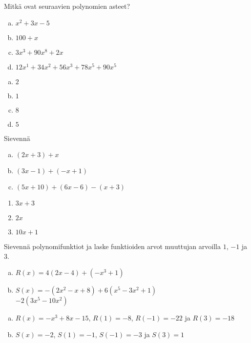 \begin{tehtavasivu}
\begin{tehtava}
	Mitkä ovat seuraavien polynomien asteet?
	\begin{enumerate}[a)]
		\item $x^2 + 3x - 5$
		\item $100 + x$
		\item $3x^3 + 90x^8 + 2x$
		\item $12x^1 + 34x^2 + 56x^3 + 78x^5 + 90x^5$
	\end{enumerate}

	\begin{vastaus}
		\begin{enumerate}[a)]
			\item $2$
			\item $1$
			\item $8$
			\item $5$
		\end{enumerate}
	\end{vastaus}
\end{tehtava}

\begin{tehtava}
     Sievennä
     \begin{enumerate}[a)]
         \item $(2x + 3) + x $
         \item $(3x - 1) + (-x + 1)$
         \item $(5x + 10) + (6x - 6) - (x + 3)$
     \end{enumerate}
     \begin{vastaus}
         \begin{enumerate}
             \item $3x + 3$
             \item $2x$
             \item $10x + 1$
         \end{enumerate}
     \end{vastaus}
 \end{tehtava}

\begin{tehtava}
	Sievennä polynomifunktiot ja laske funktioiden arvot muuttujan arvoilla $1$, $-1$ ja $3$.
	\begin{enumerate}[a)]
		\item $R(x)=4(2x-4)+(-x^3+1)$
		\item $S(x)=-(2x^2-x+8)+6(x^5-3x^2+1)$ \\ $-2(3x^5-10x^2)$
	\end{enumerate}
	\begin{vastaus}
		\begin{enumerate}[a)]
			\item $R(x)=-x^3+8x-15$, $R(1)=-8$, $R(-1)=-22$ ja $R(3)=-18$
			\item $S(x)=-2$, $S(1)=-1$, $S(-1)=-3$ ja $S(3)=1$
		\end{enumerate}
	\end{vastaus}
\end{tehtava}

\end{tehtavasivu}